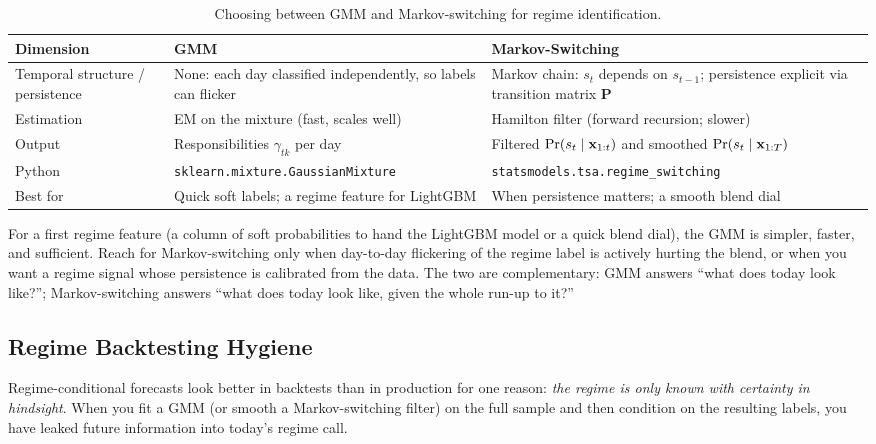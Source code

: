 \begin{table}[htbp]
\centering
\caption{Choosing between GMM and Markov-switching for regime
  identification.}
\label{tab:hybrid:gmm-vs-ms}
\small
\begin{tabular}{@{}p{3.0cm}p{4.5cm}p{4.5cm}@{}}
\toprule
\textbf{Dimension} & \textbf{GMM} & \textbf{Markov-Switching} \\
\midrule
Temporal structure / persistence
  & None: each day classified independently, so labels can flicker
  & Markov chain: $s_t$ depends on $s_{t-1}$; persistence explicit via
    transition matrix $\mathbf{P}$ \\
\addlinespace
Estimation
  & EM on the mixture (fast, scales well)
  & Hamilton filter (forward recursion; slower) \\
\addlinespace
Output
  & Responsibilities $\gamma_{tk}$ per day
  & Filtered $\Pr(s_t \mid \mathbf{x}_{1:t})$ and smoothed
    $\Pr(s_t \mid \mathbf{x}_{1:T})$ \\
\addlinespace
Python
  & \texttt{sklearn.mixture.GaussianMixture}
  & \texttt{statsmodels.tsa.regime\_switching} \\
\addlinespace
Best for
  & Quick soft labels; a regime feature for LightGBM
  & When persistence matters; a smooth blend dial \\
\bottomrule
\end{tabular}
\end{table}

\begin{keyidea}
For a first regime feature (a column of soft probabilities to hand the
LightGBM model or a quick blend dial), the GMM is simpler, faster, and
sufficient.  Reach for Markov-switching only when day-to-day flickering of
the regime label is actively hurting the blend, or when you want a regime
signal whose persistence is calibrated from the data.  The two are
complementary: GMM answers ``what does today look like?''; Markov-switching
answers ``what does today look like, given the whole run-up to it?''
\end{keyidea}

\subsection{Regime Backtesting Hygiene}
\label{sec:hybrid:regime-hygiene}

Regime-conditional forecasts look better in backtests than in production
for one reason: \emph{the regime is only known with certainty in
hindsight}.  When you fit a GMM (or smooth a Markov-switching filter) on
the full sample and then condition on the resulting labels, you have leaked
future information into today's regime call.

